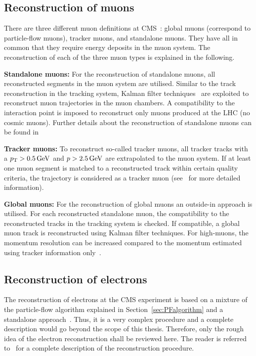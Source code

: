 \subsection{Reconstruction of muons}
There are three different muon definitions at CMS~\cite{bib:CMS:muon_recoEff}: global muons (correspond to particle-flow muons), tracker muons, and standalone muons.
They have all in common that they require energy deposits in the muon system.
The reconstruction of each of the three muon types is explained in the following.
\begin{description}
\item \textbf{Standalone muons:} For the reconstruction of standalone muons, all reconstructed segments in the muon system are utilised. Similar to the track reconstruction in the tracking system, Kalman filter techniques~\cite{bib:KalmanFilter_1987} are exploited to reconstruct muon trajectories in the muon chambers.
A compatibility to the interaction point is imposed to reconstruct only muons produced at the LHC (no cosmic muons).
Further details about the reconstruction of standalone muons can be found in~\cite{bib:StandaloneMuonReconstruction,bib:CMS:TDR_2006} 
\item \textbf{Tracker muons:} To reconstruct so-called tracker muons, all tracker tracks with a $p_{\text{T}}>0.5\,\text{Ge}\kern-0.06667em\text{V}$ and $p>2.5\,\text{Ge}\kern-0.06667em\text{V}$ are extrapolated to the muon system. If at least one muon segment is matched to a reconstructed track within certain quality criteria, the trajectory is considered as a tracker muon (see~\cite{bib:CMS:muon_recoEff} for more detailed information).
\item \textbf{Global muons:} For the reconstruction of global muons an outside-in approach is utilised. For each reconstructed standalone muon, the compatibility to the reconstructed tracks in the tracking system is checked. If compatible, a global muon track is reconstructed using Kalman filter techniques. For high-\pt muons, the momentum resolution can be increased compared to the momentum estimated using tracker information only~\cite{bib:CMS:muon_recoEff}.
\end{description}

\subsection{Reconstruction of electrons}
The reconstruction of electrons at the CMS experiment is based on a mixture of the particle-flow algorithm explained in Section~\ref{sec:PFalgorithm} and a standalone approach~\cite{bib:StandaloneElectronReconstruction}.
Thus, it is a very complex procedure and a complete description would go beyond the scope of this thesis.
Therefore, only the rough idea of the electron reconstruction shall be reviewed here.
The reader is referred to~\cite{bib:CMS:elec_recoEff} for a complete description of the reconstruction procedure.

